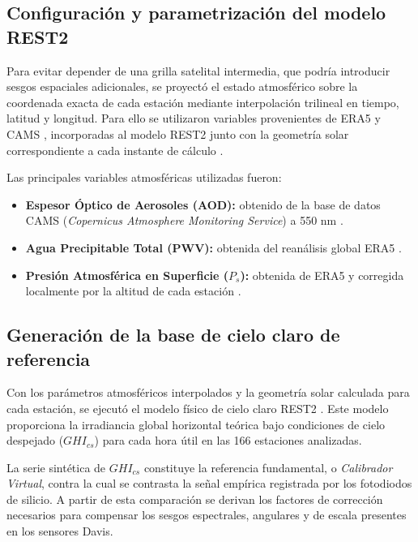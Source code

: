 \documentclass[../main.tex]{subfiles}
\begin{document}
\subsection{Configuración y parametrización del modelo REST2}

Para evitar depender de una grilla satelital intermedia, que podría introducir sesgos espaciales adicionales, se proyectó el estado atmosférico sobre la coordenada exacta de cada estación mediante interpolación trilineal en tiempo, latitud y longitud. Para ello se utilizaron variables provenientes de ERA5 \cite{hersbach_2020_era5} y CAMS \cite{inness_2019_cams}, incorporadas al modelo REST2 junto con la geometría solar correspondiente a cada instante de cálculo \cite{reda_andreas_2004,holmgren_2018_pvlib}.

Las principales variables atmosféricas utilizadas fueron:

\begin{itemize} 
\item \textbf{Espesor Óptico de Aerosoles (AOD):} obtenido de la base de datos CAMS (\textit{Copernicus Atmosphere Monitoring Service}) a 550 nm \cite{inness_2019_cams}. 
\item \textbf{Agua Precipitable Total (PWV):} obtenida del reanálisis global ERA5 \cite{hersbach_2020_era5}. \item \textbf{Presión Atmosférica en Superficie ($P_s$):} obtenida de ERA5 y corregida localmente por la altitud de cada estación \cite{hersbach_2020_era5}. \end{itemize}

\subsection{Generación de la base de cielo claro de referencia}

Con los parámetros atmosféricos interpolados y la geometría solar calculada para cada estación, se ejecutó el modelo físico de cielo claro REST2 \cite{gueymard_2008_rest2}. Este modelo proporciona la irradiancia global horizontal teórica bajo condiciones de cielo despejado ($GHI_{cs}$) para cada hora útil en las 166 estaciones analizadas.

La serie sintética de $GHI_{cs}$ constituye la referencia fundamental, o \textit{Calibrador Virtual}, contra la cual se contrasta la señal empírica registrada por los fotodiodos de silicio. A partir de esta comparación se derivan los factores de corrección necesarios para compensar los sesgos espectrales, angulares y de escala presentes en los sensores Davis.
\end{document}

